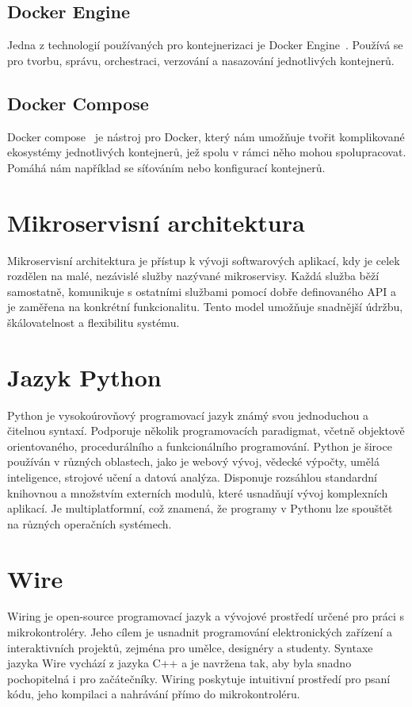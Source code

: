 \subsection{Docker Engine}\label{subsec:docker-engine}
Jedna z technologií používaných pro kontejnerizaci je Docker Engine~\cite{kontejnerizace-docker}.
Používá se pro tvorbu, správu, orchestraci, verzování a nasazování jednotlivých kontejnerů.

\subsection{Docker Compose}\label{subsec:docker-compose}
Docker compose~\cite{kontejnerizace-docker-compose} je nástroj pro Docker, který nám umožňuje tvořit komplikované ekosystémy jednotlivých kontejnerů, jež spolu v rámci něho mohou spolupracovat.
Pomáhá nám například se síťováním nebo konfigurací kontejnerů.


\section{Mikroservisní architektura}\label{sec:microservice-architecture}
Mikroservisní architektura je přístup k vývoji softwarových aplikací, kdy je celek rozdělen na malé, nezávislé služby nazývané mikroservisy.
Každá služba běží samostatně, komunikuje s ostatními službami pomocí dobře definovaného API a je zaměřena na konkrétní funkcionalitu.
Tento model umožňuje snadnější údržbu, škálovatelnost a flexibilitu systému.


\section{Jazyk Python}\label{sec:python}
Python je vysokoúrovňový programovací jazyk známý svou jednoduchou a čitelnou syntaxí.
Podporuje několik programovacích paradigmat, včetně objektově orientovaného, procedurálního a funkcionálního programování.
Python je široce používán v různých oblastech, jako je webový vývoj, vědecké výpočty, umělá inteligence, strojové učení a datová analýza.
Disponuje rozsáhlou standardní knihovnou a množstvím externích modulů, které usnadňují vývoj komplexních aplikací.
Je multiplatformní, což znamená, že programy v Pythonu lze spouštět na různých operačních systémech.


\section{Wire}\label{sec:wiring}
Wiring je open-source programovací jazyk a vývojové prostředí určené pro práci s mikrokontroléry.
Jeho cílem je usnadnit programování elektronických zařízení a interaktivních projektů, zejména pro umělce, designéry a studenty.
Syntaxe jazyka Wire vychází z jazyka C++ a je navržena tak, aby byla snadno pochopitelná i pro začátečníky.
Wiring poskytuje intuitivní prostředí pro psaní kódu, jeho kompilaci a nahrávání přímo do mikrokontroléru.


